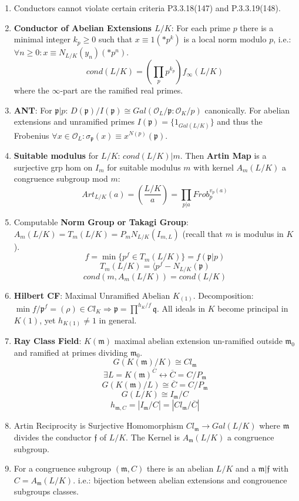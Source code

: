 \documentclass{article}
\newcommand{\OO}{\mathcal{O}}
\newcommand{\pp}{\mathfrak{p}}
\newcommand{\qq}{\mathfrak{q}}
\newcommand{\ff}{\mathfrak{f}}
\newcommand{\mm}{\mathfrak{m}}
\newcommand{\ra}{\rightarrow}
\newcommand{\Ra}{\Rightarrow}
\newcommand{\lra}{\leftrightarrow}
\begin{document}
\begin{multicols}{2}
\begin{enumerate}
\item Conductors cannot violate certain criteria P3.3.18(147) and P.3.3.19(148).

\item \textbf{Conductor of Abelian Extensions $L/K$}: For each prime $p$ there is a minimal integer $k_p \geq 0$ such that $x \equiv 1 (*p^k)$ is a local norm modulo $p$, i.e.: $\forall n \geq 0: x \equiv N_{L/K}(y_n) (*p^n)$. 
\[cond(L/K) = \left(\prod_p p^{k_p}\right) f_\infty(L/K)\]
where the $\infty$-part are the ramified real primes. 

\item \textbf{ANT}: For $\pp|p$: $D(\pp)/I(\pp) \cong Gal(\OO_L/\pp: \OO_K/p)$ canonically. For abelian extensions and unramified primes $I(\pp) = \{1_{Gal(L/K)}\}$ and thus the Frobenius $\forall x \in \OO_L: \sigma_\pp(x) \equiv x^{N(p)} (\pp)$.

\item \textbf{Suitable modulus} for $L/K$: $cond(L/K)|m$. Then \textbf{Artin Map} is a surjective grp hom on $I_m$ for suitable modulus $m$ with kernel $A_m(L/K)$ a congruence subgroup mod $m$: 
\[Art_{L/K}(a) = (\frac{L/K}{a}) = \prod_{p|a} Frob_p^{v_p(a)}\]

\item Computable \textbf{Norm Group or Takagi Group}: $A_m(L/K) = T_m(L/K) = P_m N_{L/K}(I_{m,L})$ (recall that $m$ is modulus in $K$). 
\[f = \min\{p^f \in T_m(L/K)\} = f(\pp|p)\]
\[T_m(L/K) = \langle p^f - N_{L/K}(\pp)\]
\[cond(m, A_m(L/K)) = cond(L/K)\]



\item \textbf{Hilbert CF}: Maximal Unramified Abelian $K_(1)$. Decomposition: $\min f/\pp^f = (\rho) \in Cl_K \Ra \pp = \prod^{h_K/f} \qq$. All ideals in $K$ become principal in $K(1)$, yet $h_{K(1)} \neq 1$ in general. 


\item \textbf{Ray Class Field}: $K(\mm)$ maximal abelian extension un-ramified outside $\mm_0$ and ramified at primes dividing $\mm_0$. 
\[G(K(\mm)/K) \cong Cl_\mm\]
\[\exists L = K(\mm)^{\overline{C}} \lra \overline{C} = C/P_\mm\]  
\[G(K(\mm)/L) \cong \overline{C} = C/P_\mm\]
\[G(L/K) \cong I_\mm/C\]
\[h_{\mm,C} = |I_\mm/C| = |Cl_\mm/\overline{C}|\]

\item Artin Reciprocity is Surjective Homomorphism $Cl_\mm \ra Gal(L/K)$ where $\mm$ divides the conductor $\ff$ of $L/K$. The Kernel is $A_\mm(L/K)$ a congruence subgroup. 

\item For a congruence subgroup $(\mm,C)$ there is an abelian $L/K$ and a $\mm|\ff$ with $C = A_\mm(L/K)$. i.e.: bijection between abelian extensions and congrouence subgroups classes. 
 
 
 

\end{enumerate}
\end{multicols}
\end{document}
